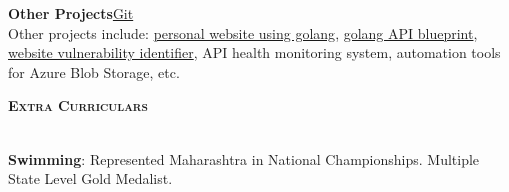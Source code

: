 \documentclass[a4paper]{article}
\newcommand{\lineunder} {
\vspace*{-8pt} \\
\hspace*{-18pt} \hrulefill \\
}
\newcommand{\header}[1]{%
{\hspace*{-18pt}\vspace*{6pt} \textsc{\textbf{\Large{#1}}}}%
\vspace*{-6pt} \lineunder
}
\begin{document}

{\textbf{Other Projects}\hfill \href{https://github.com/swarnimcodes/}{Git}} \\
Other projects include: 
\href{https://github.com/swarnimcodes/website}{personal website using golang},
\href{https://github.com/swarnimcodes/apigo}{golang API blueprint},
\href{https://github.com/swarnimcodes/website-security-checker}{website vulnerability identifier},
API health monitoring system, 
automation tools for Azure Blob Storage, etc.
\vspace{2mm}


\vspace{2mm}
\header{Extra Curriculars}
\vspace{1mm}

\textbf{Swimming}: Represented Maharashtra in National Championships. Multiple State Level Gold Medalist.
\end{document}
